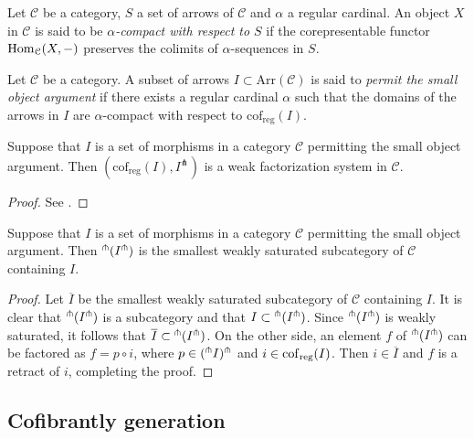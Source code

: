 \begin{refsection}
\begin{defin}
Let $\mathcal C$ be a category, $S$ a set of arrows of $\mathcal C$ and $\alpha$ a regular cardinal. An object $X$ in $\mathcal C$ is said to be \emph{$\alpha$-compact with respect to $S$} if the corepresentable functor $\mathrm{Hom}_{\mathcal C}(X,-)$ preserves the colimits of $\alpha$-sequences in $S$.
\end{defin}

\begin{defin}
Let $\mathcal C$ be a category. A subset of arrows $I \subset \mathrm{Arr}(\mathcal C)$ is said to \emph{permit the small object argument} if there exists a regular cardinal $\alpha$ such that the domains of the arrows in $I$ are $\alpha$-compact with respect to $\mathrm{cof}_{\mathrm{reg}}(I)$.
\end{defin}

\begin{thm}
Suppose that $I$ is a set of morphisms in a category $\mathcal C$ permitting the small object argument. Then $(\mathrm{cof}_{\mathrm{reg}}(I), I^{\pitchfork})$ is a weak factorization system in $\mathcal C$.
\end{thm}

\begin{proof}
See \cite{hirschhorn}.
\end{proof}

\begin{cor} \label{cor weakly saturation}
Suppose that $I$ is a set of morphisms in a category $\mathcal C$ permitting the small object argument. Then ${}^{\pitchfork}(I^{\pitchfork})$ is the smallest weakly saturated subcategory of $\mathcal C$ containing $I$.
\end{cor}

\begin{proof}
Let $\overline{I}$ be the smallest weakly saturated subcategory of $\mathcal C$ containing $I$. It is clear that ${}^{\pitchfork}(I^{\pitchfork})$ is a subcategory and that $I \subset {}^{\pitchfork}(I^{\pitchfork})$. Since ${}^{\pitchfork}(I^{\pitchfork})$ is weakly saturated, it follows that $\overline{I} \subset {}^{\pitchfork}(I^{\pitchfork})$. On the other side, an element $f$ of ${}^{\pitchfork}(I^{\pitchfork})$ can be factored as $f = p \circ i$, where $p \in ({}^{\pitchfork}I)^{\pitchfork}$ and $i \in \mathrm{cof}_{\mathrm{reg}}(I)$. Then $i \in \overline{I}$ and $f$ is a retract of $i$, completing the proof.
\end{proof}

\subsection{Cofibrantly generation}


\end{refsection}
